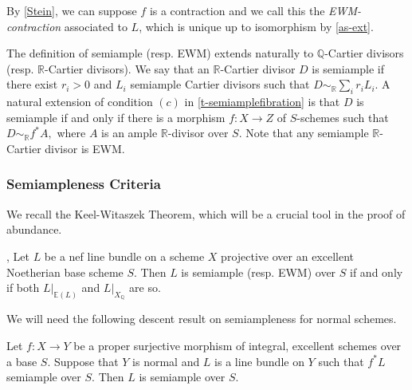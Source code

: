 	By \autoref{Stein}, we can suppose $f$ is a contraction and we call this the \emph{EWM-contraction} associated to $L$, which is unique up to isomorphism by \autoref{as-ext}.
	
	The definition of semiample (resp. EWM) extends naturally to $\mathbb{Q}$-Cartier divisors (resp. $\mathbb{R}$-Cartier divisors).
	We say that an $\mathbb{R}$-Cartier divisor $D$ is semiample if there exist $r_i>0$ and $L_i$ semiample Cartier divisors such that $D \sim_{\mathbb{R}}\sum_i r_{i}L_{i}$. A natural extension of condition $(c)$ in \autoref{t-semiamplefibration} is that $D$ is semiample if and only if there is a morphism $f \colon X \to Z$ of $S$-schemes such that $D\sim_{\mathbb{R}} f^*A,$ where $A$ is an ample $\mathbb{R}$-divisor over $S$. Note that any semiample $\mathbb{R}$-Cartier divisor is EWM.
	

	\subsubsection{Semiampleness Criteria}
	
	We recall the Keel-Witaszek Theorem, which will be a crucial tool in the proof of abundance.

	
	\begin{theorem}\cite[Theorem 6.1]{witaszek2020keels}, \cite[Theorem 2.44]{bhatt2020}
		Let $L$ be a nef line bundle on a scheme $X$
		projective over an excellent Noetherian base scheme $S$. Then $L$ is semiample (resp. EWM) over $S$ if and only if both $L|_{\mathbb{E}(L)}$ and $L|_{X_{\mathbb{Q}}}$
		are so. 
	\end{theorem}
	
	We will need the following descent result on semiampleness for normal schemes.
	
	\begin{lemma}\label{pullback}
		
		Let $f \colon X \to Y$ be a proper surjective morphism of integral, excellent schemes over a base $S$. Suppose that $Y$ is normal and $L$  is a line bundle on $Y$ such that $f^{*}L$ semiample over $S$.
		Then $L$ is semiample over $S$.
		
	\end{lemma}
	
